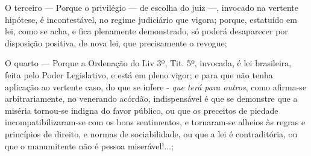 O terceiro --- Porque o privilégio --- de escolha do juiz ---,
invocado na vertente hipótese, é incontestável, no regime judiciário que
vigora; porque, estatuído em lei, como se acha, e fica plenamente
demonstrado, só poderá desaparecer por disposição positiva, de nova lei,
que precisamente o revogue;

O quarto --- Porque a Ordenação do Liv 3º, Tit. 5º, invocada, é lei
brasileira, feita pelo Poder Legislativo, e está em pleno vigor; e para
que não tenha aplicação ao vertente caso, do que se infere - \emph{que
terá para outros}, como afirma-se arbitrariamente, no venerando acórdão,
indispensável é que se demonstre que a miséria tornou-se indigna do
favor público, ou que os preceitos de piedade incompatibilizaram-se com
os bons sentimentos, e tornaram-se alheios às regras e princípios de
direito, e normas de sociabilidade, ou que a lei é contraditória, ou que
o manumitente não é pessoa miserável!...;

